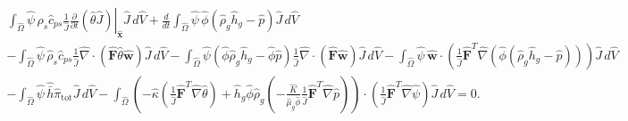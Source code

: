 \documentclass[11pt]{article}
\begin{document}
\begin{multline}
\int_{\widehat{\Omega}}
\widehat{\psi}\,\widehat{\rho}_{s} \widehat{c}_{ps} \frac{1}{\widehat{J}} \left. \frac{\partial}{\partial t} \left( \widehat{\theta} \widehat{J} \right)\right|_{\widehat{\mathbf{x}}} \widehat{J}\,d\widehat{V}
+ \frac{d}{dt} \int_{\widehat{\Omega}}
\widehat{\psi}\,\widehat{\phi}(\widehat{\rho}_g \widehat{h}_g - \widehat{p}) \widehat{J}\,d\widehat{V}
\\
- \int_{\widehat{\Omega}}
\widehat{\psi}\,\widehat{\rho}_{s} \widehat{c}_{ps}
\frac{1}{\widehat{J}} \widehat{\nabla} \cdot \left( \widehat{\mathbf{F}} \widehat{\theta} \widehat{\mathbf{w}} \right)
\widehat{J}\,d\widehat{V}
- \int_{\widehat{\Omega}} \widehat{\psi} \left( \widehat{\phi} \widehat{\rho}_g \widehat{h}_g - \widehat{\phi} \widehat{p} \right)
\frac{1}{\widehat{J}} \widehat{\nabla} \cdot \left( \widehat{\mathbf{F}} \widehat{\mathbf{w}} \right)
\widehat{J}\,d\widehat{V}
- \int_{\widehat{\Omega}}
\widehat{\psi}\,\widehat{\mathbf{w}} \cdot
\left(
\frac{1}{\widehat{J}} \widehat{\mathbf{F}}^{T} \widehat{\nabla}\left( \widehat{\phi}(\widehat{\rho}_g \widehat{h}_g - \widehat{p}) \right)
\right) \widehat{J}\,d\widehat{V}
\\
- \int_{\widehat{\Omega}}
\widehat{\psi}\,\widehat{\bar{h}} \widehat{\pi}_{\mathrm{tot}}\widehat{J}\,d\widehat{V}
- \int_{\widehat{\Omega}}
\left(
 -\widehat{\kappa}
 \left(
 \frac{1}{\widehat{J}} \widehat{\mathbf{F}}^{T} \widehat{\nabla}\widehat{\theta}
 \right)
+ \widehat{h}_g \widehat{\phi} \widehat{\rho}_g
\left(
-\frac{\widehat{K}}{\widehat{\mu}_g \widehat{\phi}} \frac{1}{\widehat{J}} \widehat{\mathbf{F}}^{T} \widehat{\nabla} \widehat{p}
\right)
 \right) \cdot
\left(
\frac{1}{\widehat{J}} \widehat{\mathbf{F}}^{T} \widehat{\nabla}\widehat{\psi}
\right) \widehat{J}\,d\widehat{V}
= 0.
\end{multline}
\end{document}

